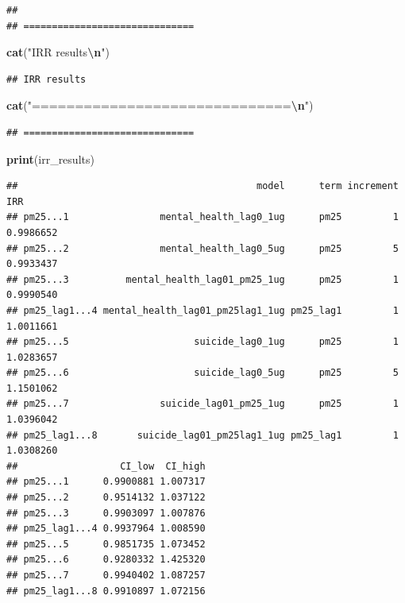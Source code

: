 \documentclass[
]{article}
\newenvironment{Shaded}{\begin{snugshade}}{\end{snugshade}}
\newcommand{\FunctionTok}[1]{\textcolor[rgb]{0.13,0.29,0.53}{\textbf{#1}}}
\newcommand{\NormalTok}[1]{#1}
\newcommand{\SpecialCharTok}[1]{\textcolor[rgb]{0.81,0.36,0.00}{\textbf{#1}}}
\newcommand{\StringTok}[1]{\textcolor[rgb]{0.31,0.60,0.02}{#1}}
\begin{document}
\begin{verbatim}
## 
## ==============================
\end{verbatim}

\begin{Shaded}
\begin{Highlighting}[]
\FunctionTok{cat}\NormalTok{(}\StringTok{"IRR results}\SpecialCharTok{\textbackslash{}n}\StringTok{"}\NormalTok{)}
\end{Highlighting}
\end{Shaded}

\begin{verbatim}
## IRR results
\end{verbatim}

\begin{Shaded}
\begin{Highlighting}[]
\FunctionTok{cat}\NormalTok{(}\StringTok{"==============================}\SpecialCharTok{\textbackslash{}n}\StringTok{"}\NormalTok{)}
\end{Highlighting}
\end{Shaded}

\begin{verbatim}
## ==============================
\end{verbatim}

\begin{Shaded}
\begin{Highlighting}[]
\FunctionTok{print}\NormalTok{(irr\_results)}
\end{Highlighting}
\end{Shaded}

\begin{verbatim}
##                                          model      term increment       IRR
## pm25...1                mental_health_lag0_1ug      pm25         1 0.9986652
## pm25...2                mental_health_lag0_5ug      pm25         5 0.9933437
## pm25...3          mental_health_lag01_pm25_1ug      pm25         1 0.9990540
## pm25_lag1...4 mental_health_lag01_pm25lag1_1ug pm25_lag1         1 1.0011661
## pm25...5                      suicide_lag0_1ug      pm25         1 1.0283657
## pm25...6                      suicide_lag0_5ug      pm25         5 1.1501062
## pm25...7                suicide_lag01_pm25_1ug      pm25         1 1.0396042
## pm25_lag1...8       suicide_lag01_pm25lag1_1ug pm25_lag1         1 1.0308260
##                  CI_low  CI_high
## pm25...1      0.9900881 1.007317
## pm25...2      0.9514132 1.037122
## pm25...3      0.9903097 1.007876
## pm25_lag1...4 0.9937964 1.008590
## pm25...5      0.9851735 1.073452
## pm25...6      0.9280332 1.425320
## pm25...7      0.9940402 1.087257
## pm25_lag1...8 0.9910897 1.072156
\end{verbatim}
\end{document}
